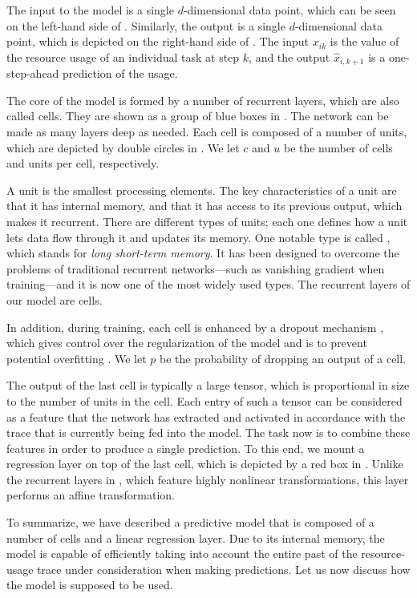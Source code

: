 The input to the model is a single $d$-dimensional data point, which can be seen
on the left-hand side of . Similarly, the output is a single
$d$-dimensional data point, which is depicted on the right-hand side of
. The input $x_{ik}$ is the value of the resource usage of an
individual task at step $k$, and the output $\hat{x}_{i,k + 1}$ is a
one-step-ahead prediction of the usage.

The core of the model is formed by a number of recurrent layers, which are also
called cells. They are shown as a group of blue boxes in . The
network can be made as many layers deep as needed. Each cell is composed of a
number of units, which are depicted by double circles in . We let
$c$ and $u$ be the number of cells and units per cell, respectively.

A unit is the smallest processing elements. The key characteristics of a unit
are that it has internal memory, and that it has access to its previous output,
which makes it recurrent. There are different types of units; each one defines
how a unit lets data flow through it and updates its memory. One notable type is
called  \cite{hochreiter1997}, which stands for \emph{long short-term
memory}. It has been designed to overcome the problems of traditional recurrent
networks---such as vanishing gradient when training---and it is now one of the
most widely used types. The recurrent layers of our model are  cells.

In addition, during training, each cell is enhanced by a dropout mechanism
\cite{zaremba2014}, which gives control over the regularization of the model and
is to prevent potential overfitting \cite{hastie2013}. We let $p$ be the
probability of dropping an output of a cell.

The output of the last cell is typically a large tensor, which is proportional
in size to the number of units in the cell. Each entry of such a tensor can be
considered as a feature that the network has extracted and activated in
accordance with the trace that is currently being fed into the model. The task
now is to combine these features in order to produce a single prediction. To
this end, we mount a regression layer on top of the last cell, which is depicted
by a red box in . Unlike the recurrent layers in ,
which feature highly nonlinear transformations, this layer performs an affine
transformation.

To summarize, we have described a predictive model that is composed of a number
of  cells and a linear regression layer. Due to its internal memory,
the model is capable of efficiently taking into account the entire past of the
resource-usage trace under consideration when making predictions. Let us now
discuss how the model is supposed to be used.

